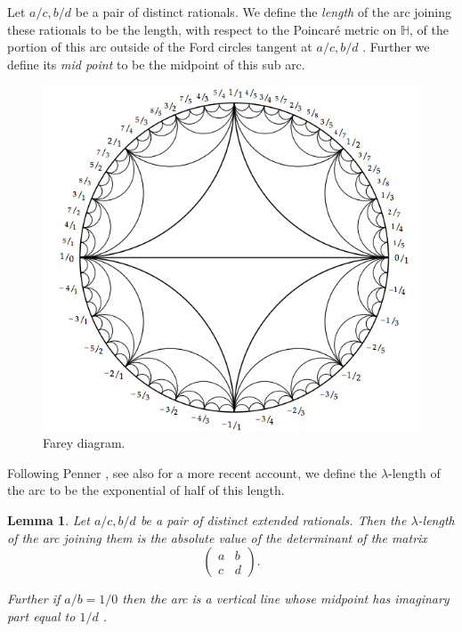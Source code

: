 \documentclass[12pt,a4paper]{amsart}
\newtheorem{lem}[thm]{Lemma}
\def\HH{\mathbb{H}}
\def\xx{\HH/g2}
\def\ZZ{\mathbb{Z}}
\def\sl2{\mathrm{SL}(2, \ZZ)}
\def\g2{\Gamma(2)}
\def\xx{\HH/\g2}
\begin{document}


Let $a/c, b/d$ be a pair of distinct rationals.
We define the \textit{length} of the arc 
joining these rationals 
to be the length, with respect to the Poincar\'e metric on $\HH$, 
of the portion of this arc 
outside of the Ford circles tangent at $a/c, b/d$ .
Further we define its  \textit{mid point} to be the midpoint of this sub arc.

\begin{figure}[ht]
\begin{center}
\includegraphics[scale=.5]{farey_diagram.png} 
\end{center}
\caption{Farey diagram.}
\label{farey diagram}
\end{figure}


Following Penner \cite{bob}, 
see also \cite{spring} for a more recent account,
we define the
$\lambda$-length of the arc to be the exponential of half
of this length.

\begin{lem}\label{calcul}
Let $a/c, b/d$ be a pair of distinct extended rationals.
Then the  $\lambda$-length of the arc joining them
 is the absolute value of the determinant of the matrix
$$\begin{pmatrix}
a & b \\ c & d
\end{pmatrix}.$$

Further if $a/b = 1/0$ then the arc is a vertical line 
 whose midpoint has imaginary part equal to $1/d$ .
\end{lem}
\end{document}
